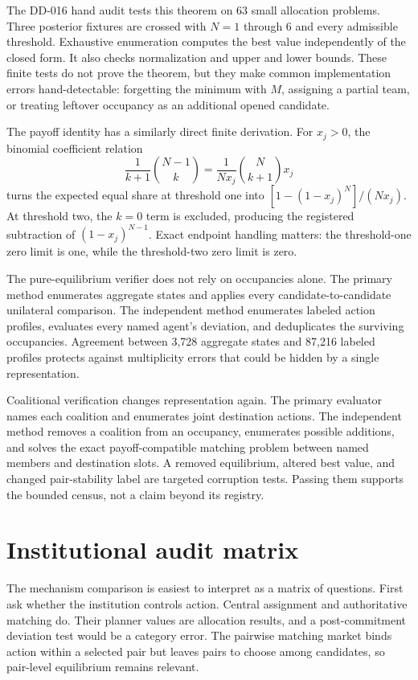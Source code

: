 \documentclass[11pt]{article}
\begin{document}
The DD-016 hand audit tests this theorem on 63 small allocation problems. Three
posterior fixtures are crossed with $N=1$ through $6$ and every admissible
threshold. Exhaustive enumeration computes the best value independently of the
closed form. It also checks normalization and upper and lower bounds. These
finite tests do not prove the theorem, but they make common implementation
errors hand-detectable: forgetting the minimum with $M$, assigning a partial
team, or treating leftover occupancy as an additional opened candidate.

The payoff identity has a similarly direct finite derivation. For $x_j>0$,
the binomial coefficient relation
\begin{equation}
 \frac{1}{k+1}{N-1\choose k}=\frac{1}{Nx_j}{N\choose k+1}x_j
\end{equation}
turns the expected equal share at threshold one into
$[1-(1-x_j)^N]/(Nx_j)$. At threshold two, the $k=0$ term is excluded, producing
the registered subtraction of $(1-x_j)^{N-1}$. Exact endpoint handling matters:
the threshold-one zero limit is one, while the threshold-two zero limit is zero.

The pure-equilibrium verifier does not rely on occupancies alone. The primary
method enumerates aggregate states and applies every candidate-to-candidate
unilateral comparison. The independent method enumerates labeled action
profiles, evaluates every named agent's deviation, and deduplicates the
surviving occupancies. Agreement between 3,728 aggregate states and 87,216
labeled profiles protects against multiplicity errors that could be hidden by a
single representation.

Coalitional verification changes representation again. The primary evaluator
names each coalition and enumerates joint destination actions. The independent
method removes a coalition from an occupancy, enumerates possible additions,
and solves the exact payoff-compatible matching problem between named members
and destination slots. A removed equilibrium, altered best value, and changed
pair-stability label are targeted corruption tests. Passing them supports the
bounded census, not a claim beyond its registry.

\section{Institutional audit matrix}

The mechanism comparison is easiest to interpret as a matrix of questions.
First ask whether the institution controls action. Central assignment and
authoritative matching do. Their planner values are allocation results, and a
post-commitment deviation test would be a category error. The pairwise matching
market binds action within a selected pair but leaves pairs to choose among
candidates, so pair-level equilibrium remains relevant.
\end{document}
